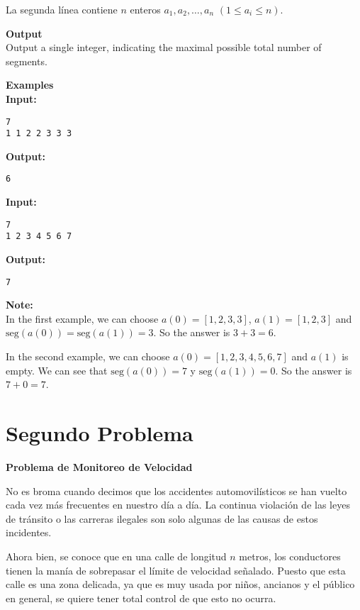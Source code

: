 \documentclass{article}
\begin{document}
La segunda línea contiene \( n \) enteros \( a_1, a_2, \ldots, a_n \) \( (1 \leq a_i \leq n) \).

\large \textbf{Output}\\
Output a single integer, indicating the maximal possible total number of segments.

\large \textbf{Examples}\\
\textbf{Input:}
\begin{verbatim}
7
1 1 2 2 3 3 3
\end{verbatim}

\textbf{Output:}
\begin{verbatim}
6
\end{verbatim}

\textbf{Input:}
\begin{verbatim}
7
1 2 3 4 5 6 7
\end{verbatim}

\textbf{Output:}
\begin{verbatim}
7
\end{verbatim}

\textbf{Note:} \\
In the first example, we can choose \( a(0)=[1,2,3,3] \), \( a(1)=[1,2,3] \) and \( \text{seg}(a(0))=\text{seg}(a(1))=3 \). So the answer is \( 3+3=6 \).

In the second example, we can choose \( a(0)=[1,2,3,4,5,6,7] \) and \( a(1) \) is empty. We can see that \( \text{seg}(a(0))=7 \) y \( \text{seg}(a(1))=0 \). So the answer is \( 7+0=7 \).

\section{Segundo Problema}

\begin{center}
    \LARGE \textbf{Problema de Monitoreo de Velocidad} \\[0.5em] 
\end{center}

No es broma cuando decimos que los accidentes automovilísticos se han vuelto cada vez más frecuentes en nuestro día a día. La continua violación de las leyes de tránsito o las carreras ilegales son solo algunas de las causas de estos incidentes. 

Ahora bien, se conoce que en una calle de longitud \( n \) metros, los conductores tienen la manía de sobrepasar el límite de velocidad señalado. Puesto que esta calle es una zona delicada, ya que es muy usada por niños, ancianos y el público en general, se quiere tener total control de que esto no ocurra. 
\end{document}

